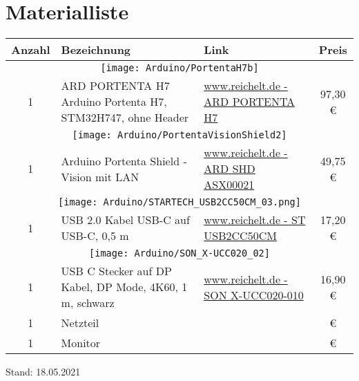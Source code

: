 %
%


\chapter{Materialliste}



	\begin{longtable}{cp{6.1cm}p{2.5cm}c}
      \textbf{Anzahl} & \textbf{Bezeichnung} & \textbf{Link} & \textbf{Preis} \\ \hline      
      \multicolumn{4}{c}{\texttt{[image: Arduino/PortentaH7b]}} \\
      1      & ARD PORTENTA H7 Arduino Portenta H7, STM32H747, ohne Header
             & \href{https://www.reichelt.de/arduino-portenta-h7-stm32h747-ohne-header-ard-portenta-h7-p292399.html}{www.reichelt.de -  ARD PORTENTA H7} 
             &  97{,}30 \euro{} \\ \hline
      \multicolumn{4}{c}{\texttt{[image: Arduino/PortentaVisionShield2]}} \\
      1       & Arduino Portenta Shield - Vision mit LAN
              & \href{https://www.reichelt.de/arduino-portenta-shield-vision-mit-lan-ard-shd-asx00021-p292402.html}{www.reichelt.de - ARD SHD ASX00021} 
              &  49{,}75 \euro{} \\ \hline
      \multicolumn{4}{c}{\texttt{[image: Arduino/STARTECH\_USB2CC50CM\_03.png]}} \\
      1       & USB 2.0 Kabel USB-C auf USB-C, 0,5 m
              & \href{https://www.reichelt.de/usb-2-0-kabel-usb-c-auf-usb-c-0-5-m-st-usb2cc50cm-p280358.html}{www.reichelt.de - ST USB2CC50CM} 
              &  17{,}20 \euro{} \\ \hline
      \multicolumn{4}{c}{\texttt{[image: Arduino/SON\_X-UCC020\_02]}} \\
      1       & USB C Stecker auf DP Kabel, DP Mode, 4K60, 1 m, schwarz
              & \href{https://www.reichelt.de/usb-c-stecker-auf-dp-kabel-dp-mode-4k60-1-m-schwarz-son-x-ucc020-010-p213312.html}{www.reichelt.de - SON X-UCC020-010} 
              &  16{,}90 \euro{} \\ \hline
    1        &  Netzteil 
             & 
             &   \euro{} \\ \hline
    1        &  Monitor
& 
&   \euro{} \\ \hline
    \end{longtable}

Stand: 18.05.2021



